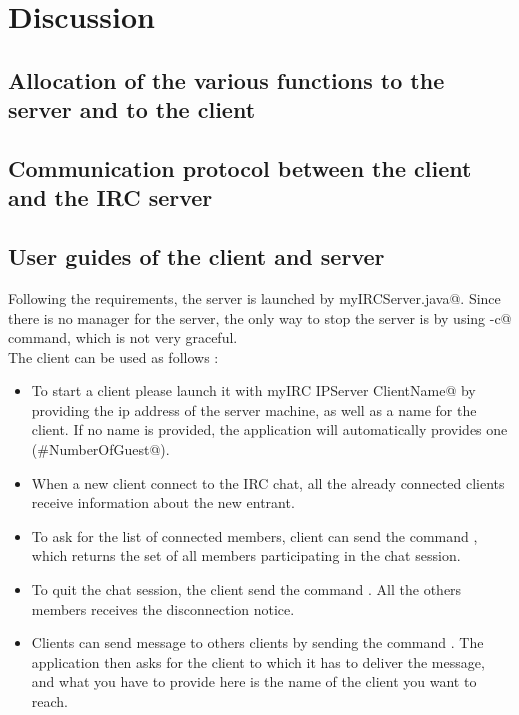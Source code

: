 \documentclass{article}
\begin{document}
\newpage


\section{Discussion}

\subsection{Allocation of the various functions to the server and to the client}
\subsection{Communication protocol between the client and the IRC server}
\subsection{User guides of the client and server}
Following the requirements, the server is launched by \verb@java myIRCServer.java@. Since there is no manager for the server, the only way to stop the server is by using \verb@ctrl-c@ command, which is not very graceful.\\

The client can be used as follows : 
\begin{itemize}
\item To start a client please launch it with \verb@java myIRC IPServer ClientName@ by providing the ip address of the server machine, as well as a name for the client. If no name is provided, the application will automatically provides one (\verb@Guest#NumberOfGuest@).
\item When a new client connect to the IRC chat, all the already connected clients receive information about the new entrant.
\item To ask for the list of connected members, client can send the command \verb@who@, which returns the set of all members participating in the chat session.
\item To quit the chat session, the client send the command \verb@quit@. All the others members receives the disconnection notice.
\item Clients can send message to others clients by sending the command \verb@msg@. The application then asks for the client to which it has to deliver the message, and what you have to provide here is the name of the client you want to reach.
\end{itemize}
\end{document}
